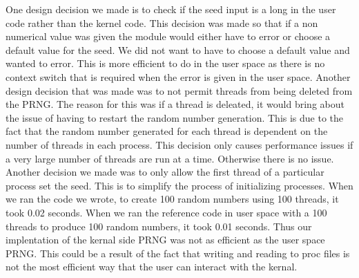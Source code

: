 \documentclass[12pt]{article}
\begin{document}
	One design decision we made is to check if the seed input is a long in the user code rather than the kernel code.
	This decision was made so that if a non numerical value was given the module would either have to error or choose a default value for the seed.
	We did not want to have to choose a default value and wanted to error. 
	This is more efficient to do in the user space as there is no context switch that is required when the error is given in the user space.
	Another design decision that was made was to not permit threads from being deleted from the PRNG. 
	The reason for this was if a thread is deleated, it would bring about the issue of having to restart the random number generation.
	This is due to the fact that the random number generated for each thread is dependent on the number of threads in each process. 
	 This decision only causes performance issues if a very large number of threads are run at a time. Otherwise there is no issue.  
	Another decision we made was to only allow the first thread of a particular process set the seed. This is to simplify the process of initializing processes. 
	When we ran the code we wrote, to create 100 random numbers using 100 threads, it took 0.02 seconds.
	When we ran the reference code in user space with a 100 threads to produce 100 random numbers, it took 0.01 seconds. 
	Thus our implentation of the kernal side PRNG was not as efficient as the user space PRNG.
	This could be a result of the fact that writing and reading to proc files is not the most efficient way that the user can interact with the kernal. 
\end{document}
